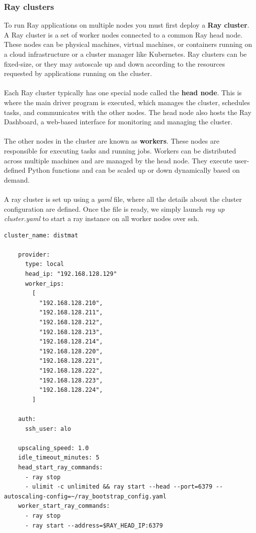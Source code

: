 \subsubsection{Ray clusters}
To run Ray applications on multiple nodes you must first deploy a \textbf{Ray cluster}. A Ray cluster is a set of worker nodes connected to a common Ray head node. These nodes can be physical machines, virtual machines, or containers running on a cloud infrastructure or a cluster manager like Kubernetes. Ray clusters can be fixed-size, or they may autoscale up and down according to the resources requested by applications running on the cluster.
\\\\
Each Ray cluster typically has one special node called the \textbf{head node}. This is where the main driver program is executed, which manages the cluster, schedules tasks, and communicates with the other nodes. The head node also hosts the Ray Dashboard, a web-based interface for monitoring and managing the cluster.
\\\\
The other nodes in the cluster are known as \textbf{workers}. These nodes are responsible for executing tasks and running jobs. Workers can be distributed across multiple machines and are managed by the head node. They execute user-defined Python functions and can be scaled up or down dynamically based on demand.
\\\\
A ray cluster is set up using a \textit{yaml} file, where all the details about the cluster configuration are defined. Once the file is ready, we simply launch \textit{ray up cluster.yaml} to start a ray instance on all worker nodes over ssh.
\begin{lstlisting}[caption={cluster.yaml}]
    cluster_name: distmat

    provider:
      type: local
      head_ip: "192.168.128.129"
      worker_ips:
        [
          "192.168.128.210",
          "192.168.128.211",
          "192.168.128.212",
          "192.168.128.213",
          "192.168.128.214",
          "192.168.128.220",
          "192.168.128.221",
          "192.168.128.222",
          "192.168.128.223",
          "192.168.128.224",
        ]
    
    auth:
      ssh_user: alo
    
    upscaling_speed: 1.0
    idle_timeout_minutes: 5
    head_start_ray_commands:
      - ray stop
      - ulimit -c unlimited && ray start --head --port=6379 --autoscaling-config=~/ray_bootstrap_config.yaml
    worker_start_ray_commands:
      - ray stop
      - ray start --address=$RAY_HEAD_IP:6379
    
\end{lstlisting}


